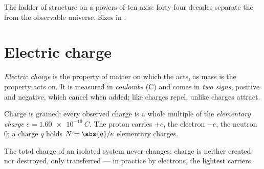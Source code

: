 \begin{omfigure}

{\small The ladder of structure on a powers-of-ten axis: forty-four
decades separate the  from the observable universe. Sizes in
.}
\end{omfigure}

\section{Electric charge}

\begin{definition}\label{def:g11:fundamental-interactions:charge}
\emph{Electric charge} is the property of matter
on which the  acts, as mass is the property
 acts on. It is measured in \emph{coulombs}
(\unit{C}) and comes in \emph{two signs}, positive and negative, which
cancel when added; like charges repel, unlike charges attract.
\end{definition}

\begin{definition}\label{def:g11:fundamental-interactions:elementary}
Charge is grained: every observed charge is a whole multiple of the
\emph{elementary charge}
$e = \qty{1.60e-19}{C}$. The proton carries $+e$, the electron $-e$, the
neutron $0$; a charge $q$ holds $N = \abs{q}/e$ elementary charges.
\end{definition}

\begin{proposition}\label{prop:g11:fundamental-interactions:conservation}
The total charge of an isolated system never changes: charge is neither
created nor destroyed, only transferred --- in practice by electrons,
the lightest carriers.
\end{proposition}
\admitted

